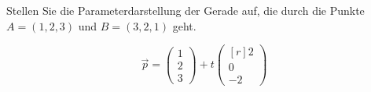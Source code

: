 Stellen Sie die Parameterdarstellung der Gerade auf, die durch die
Punkte $A=(1,2,3)$ und $B=(3,2,1)$ geht.

\begin{loesung}
\[
\vec{p}
=
\begin{pmatrix}
1\\2\\3
\end{pmatrix}
+
t
\begin{pmatrix*}[r]
2\\0\\-2
\end{pmatrix*}
\]
\end{loesung}

